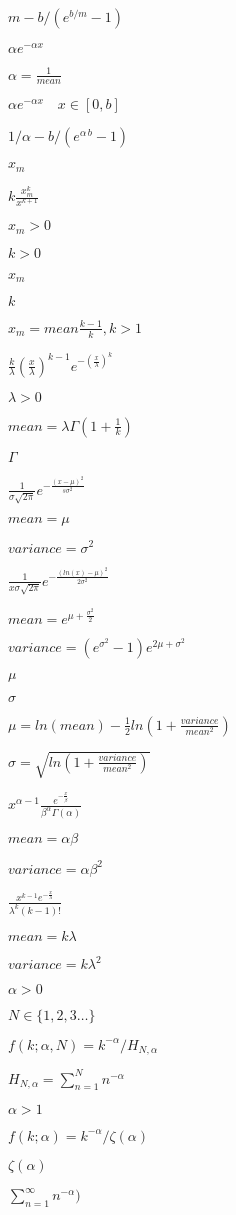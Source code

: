 \documentclass{article}
\begin{document}
$ m - b/(e^{b/m}-1) $
\pagebreak

$ \alpha e^{-\alpha x} $
\pagebreak

$ \alpha = \frac{1}{mean} $
\pagebreak

$ \alpha e^{-\alpha x} \quad x \in [0,b] $
\pagebreak

$ 1/\alpha - b/(e^{\alpha \, b}-1) $
\pagebreak

$x_m$
\pagebreak

$ k \frac{x_m^k}{x^{k+1}}$
\pagebreak

$x_m > 0$
\pagebreak

$ k > 0$
\pagebreak

$ x_m $
\pagebreak

$ k $
\pagebreak

$ x_m = mean \frac{k-1}{k}, k > 1$
\pagebreak

$ \frac{k}{\lambda}\left(\frac{x}{\lambda}\right)^{k-1}e^{-\left(\frac{x}{\lambda}\right)^k} $
\pagebreak

$ \lambda > 0$
\pagebreak

$ mean = \lambda\Gamma\left(1+\frac{1}{k}\right) $
\pagebreak

$ \Gamma $
\pagebreak

$ \frac{1}{\sigma\sqrt{2\pi}} e^{-\frac{(x-\mu)^2}{s\sigma^2}}$
\pagebreak

$ mean = \mu $
\pagebreak

$ variance = \sigma^2 $
\pagebreak

$ \frac{1}{x\sigma\sqrt{2\pi}} e^{-\frac{(ln(x) - \mu)^2}{2\sigma^2}}$
\pagebreak

$ mean = e^{\mu+\frac{\sigma^2}{2}} $
\pagebreak

$ variance = (e^{\sigma^2}-1)e^{2\mu+\sigma^2}$
\pagebreak

$ \mu $
\pagebreak

$ \sigma $
\pagebreak

$ \mu = ln(mean) - \frac{1}{2}ln\left(1+\frac{variance}{mean^2}\right)$
\pagebreak

$ \sigma = \sqrt{ln\left(1+\frac{variance}{mean^2}\right)}$
\pagebreak

$ x^{\alpha-1} \frac{e^{-\frac{x}{\beta}}}{\beta^\alpha \Gamma(\alpha)}$
\pagebreak

$ mean = \alpha\beta $
\pagebreak

$ variance = \alpha \beta^2$
\pagebreak

$ \frac{x^{k-1} e^{-\frac{x}{\lambda}}}{\lambda^k (k-1)!}$
\pagebreak

$ mean = k \lambda $
\pagebreak

$ variance = k \lambda^2$
\pagebreak

$ \alpha > 0 $
\pagebreak

$ N \in \{1,2,3 \dots\}$
\pagebreak

$ f(k; \alpha, N) = k^{-\alpha}/ H_{N,\alpha} $
\pagebreak

$ H_{N,\alpha} = \sum_{n=1}^N n^{-\alpha} $
\pagebreak

$ \alpha > 1 $
\pagebreak

$ f(k; \alpha) = k^{-\alpha}/\zeta(\alpha) $
\pagebreak

$ \zeta(\alpha) $
\pagebreak

$ \sum_{n=1}^\infty n^{-\alpha} ) $
\pagebreak
\end{document}

